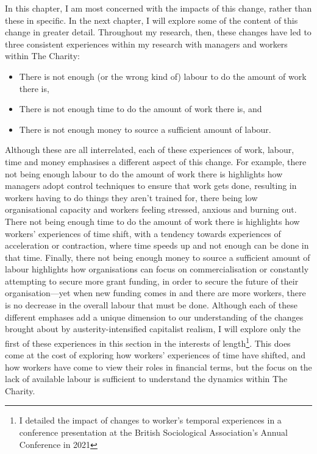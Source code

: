 In this chapter, I am most concerned with the impacts of this change, rather than these in specific. In the next chapter, I will explore some of the content of this change in greater detail. Throughout my research, then, these changes have led to three consistent experiences within my research with managers and workers within The Charity: 
\begin{itemize}
\item There is not enough (or the wrong kind of) labour to do the amount of work there is,
\item There is not enough time to do the amount of work there is, and
\item There is not enough money to source a sufficient amount of labour. 
\end{itemize}
Although these are all interrelated, each of these experiences of work, labour, time and money emphasises a different aspect of this change. For example, there not being enough labour to do the amount of work there is highlights how managers adopt control techniques to ensure that work gets done, resulting in workers having to do things they aren’t trained for, there being low organisational capacity and workers feeling stressed, anxious and burning out. There not being enough time to do the amount of work there is highlights how workers’ experiences of time shift, with a tendency towards experiences of acceleration or contraction, where time speeds up and not enough can be done in that time. Finally, there not being enough money to source a sufficient amount of labour highlights how organisations can focus on commercialisation or constantly attempting to secure more grant funding, in order to secure the future of their organisation—yet when new funding comes in and there are more workers, there is no decrease in the overall labour that must be done. Although each of these different emphases add a unique dimension to our understanding of the changes brought about by austerity-intensified capitalist realism, I will explore only the first of these experiences in this section in the interests of length\footnote{I detailed the impact of changes to worker's temporal experiences in a conference presentation at the British Sociological Association's Annual Conference in 2021}. This does come at the cost of exploring how workers' experiences of time have shifted, and how workers have come to view their roles in financial terms, but the focus on the lack of available labour is sufficient to understand the dynamics within The Charity. 
 
